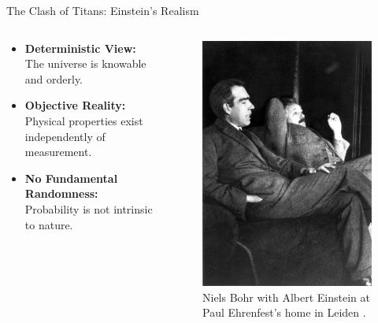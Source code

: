 \begin{frame}{The Clash of Titans: Einstein's Realism}

  \begin{columns}
    \begin{column}{0.5\textwidth}
      \begin{itemize}[<+->] %
        \item \textbf{Deterministic View:} The universe is knowable and orderly.
        \item \textbf{Objective Reality:} Physical properties exist independently of measurement.
        \item \textbf{No Fundamental Randomness:} Probability is not intrinsic to nature.
      \end{itemize}
    \end{column}

    \begin{column}{0.5\textwidth}
      \begin{center}
        \begin{figure}
          \centering
          \includegraphics[width=0.5\linewidth]{images/Borhn-Einstein.jpg}
          \caption{Niels Bohr with Albert Einstein at Paul Ehrenfest's home in Leiden \cite{ehrenfest_niels_1925}.}
        \end{figure}
      \end{center}
    \end{column}
  \end{columns}

\end{frame}

